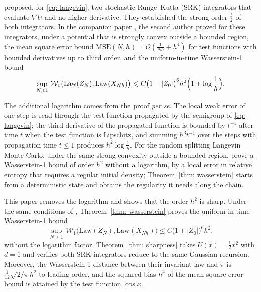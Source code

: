 \documentclass[namedate,webpdf,imanum]{ima-authoring-template}
\newcommand{\Le}{\leqslant}
\newcommand{\Ge}{\geqslant}
\theoremstyle{thmstyletwo}
\numberwithin{equation}{section}
\begin{document}
\citet{yang2026accelerating} proposed, for \eqref{eq: langevin}, two stochastic Runge--Kutta (SRK) integrators that evaluate $\nabla U$ and no higher derivative. They established the strong order $\frac32$ of both integrators. In the companion paper \citep{ye2026mse}, the second author proved for these integrators, under a potential that is strongly convex outside a bounded region, the mean square error bound $\mathrm{MSE}(N,h) = \mathcal O(\frac{1}{Nh} + h^4)$ for test functions with bounded derivatives up to third order, and the uniform-in-time Wasserstein-1 bound
\begin{equation*}
    \sup_{N \Ge 1}\, \mathcal W_1\bigl( \mathrm{Law}(Z_N), \mathrm{Law}(X_{Nh}) \bigr) \Le C \bigl( 1 + |Z_0| \bigr)^{6} h^2 \Bigl( 1 + \log\frac1h \Bigr).
\end{equation*}

The additional logarithm comes from the proof \emph{per se}. The local weak error of one step is read through the test function propagated by the semigroup of \eqref{eq: langevin}; the third derivative of the propagated function is bounded by $t^{-1}$ after time $t$ when the test function is Lipschitz, and summing $h^3 t^{-1}$ over the steps with propagation time $t \Le 1$ produces $h^2 \log\frac1h$. For the random splitting Langevin Monte Carlo, under the same strong convexity outside a bounded region, \citet{li2025random} prove a Wasserstein-1 bound of order $h^2$ without a logarithm, by a local error in relative entropy that requires a regular initial density; Theorem~\ref{thm: wasserstein} starts from a deterministic state and obtains the regularity it needs along the chain.

This paper removes the logarithm and shows that the order $h^2$ is sharp. Under the same conditions of \citet{ye2026mse}, Theorem~\ref{thm: wasserstein} proves the uniform-in-time Wasserstein-1 bound
\begin{equation*}
    \sup_{N \Ge 1}\, \mathcal W_1\bigl( \mathrm{Law}(Z_N), \mathrm{Law}(X_{Nh}) \bigr) \Le C \bigl( 1 + |Z_0| \bigr)^{6} h^2.
\end{equation*}
without the logarithm factor.
Theorem~\ref{thm: sharpness} takes $U(x) = \frac12 x^2$ with $d = 1$ and verifies both SRK integrators reduce to the same Gaussian recursion. Moreover, the Wasserstein-1 distance between their invariant law and $\pi$ is $\frac1{12}\sqrt{2/\pi}\, h^2$ to leading order, and the squared bias $h^4$ of the mean square error bound is attained by the test function $\cos x$.
\end{document}
